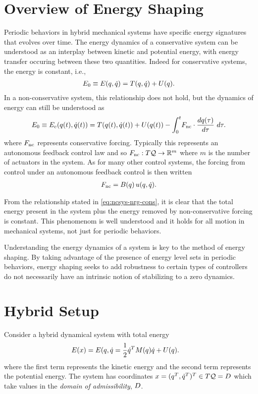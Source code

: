 \section*{Overview of Energy Shaping}
Periodic behaviors in hybrid mechanical systems have specific energy signatures that evolves over time.
%
The energy dynamics of a conservative system can be understood as an interplay between kinetic and potential energy, with energy transfer occuring between these two quantities.
%
Indeed for conservative systems, the energy is constant, i.e.,
\begin{align}
  \label{eq:consys-nrg}
  E_{0} \equiv E(q, \dot{q}) = T(q, \dot{q}) + U(q).
\end{align}
%
In a non-conservative system, this relationship does not hold, but the dynamics of energy can still be understood as
\begin{align}
  \label{eq:ncsys-nrg-cons}
  E_{0} \equiv E_{c}(q(t), \dot{q}(t)) = T(q(t), \dot{q}(t)) + U(q(t)) - \int_{0}^{t} \! F_{\mathrm{nc}} \cdot \frac{dq(\tau)}{d\tau} \ d\tau.
\end{align}
where $F_{\mathrm{nc}}$ represents conservative forcing. Typically this represents an autonomous feedback control law and so $F_{\mathrm{nc}} : T\mathcal{Q} \to \mathbb{R}^m$ where $m$ is the number of actuators in the system.
%
As for many other control systems, the forcing from control under an autonomous feedback control is then written
\begin{align}
  F_{\mathrm{nc}} = B(q) \, u(q, \dot{q}).
\end{align}

From the relationship stated in \eqref{eq:ncsys-nrg-cons}, it is clear that the total energy present in the system plus the energy removed by non-conservative forcing is constant.
%
This phenomenom is well understood and it holds for all motion in mechanical systems, not just for periodic behaviors.

Understanding the energy dynamics of a system is key to the method of energy shaping.
%
By taking advantage of the presence of energy level sets in periodic behaviors, energy shaping seeks to add robustness to certain types of controllers do not necessarily have an intrinsic notion of stabilizing to a zero dynamics.
%


\section*{Hybrid Setup}
Consider a hybrid dynamical system with total energy
\begin{align*}
  E(x) &= E(q, \dot{q} = \frac{1}{2} \dot{q}^{T} M(q) \dot{q} + U(q).
\end{align*}
where the first term represents the kinetic energy and the second term represents the potential energy.
%
The system has coordinates $x = (q^T, \dot{q}^T)^T \in T\mathcal{Q} = D$ which take values in the {\em domain of admissibility}, $D$.

